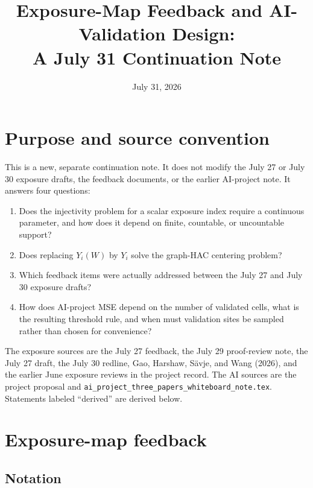 \documentclass[11pt]{article}
\title{Exposure-Map Feedback and AI-Validation Design:\\
A July 31 Continuation Note}
\author{}
\date{July 31, 2026}
\begin{document}
\maketitle

\section*{Purpose and source convention}

This is a new, separate continuation note. It does not modify the July 27 or
July 30 exposure drafts, the feedback documents, or the earlier AI-project
note. It answers four questions:
\begin{enumerate}[leftmargin=2em]
    \item Does the injectivity problem for a scalar exposure index require a
    continuous parameter, and how does it depend on finite, countable, or
    uncountable support?
    \item Does replacing \(Y_i(W)\) by \(Y_i\) solve the graph-HAC centering
    problem?
    \item Which feedback items were actually addressed between the July 27 and
    July 30 exposure drafts?
    \item How does AI-project MSE depend on the number of validated cells, what
    is the resulting threshold rule, and when must validation sites be sampled
    rather than chosen for convenience?
\end{enumerate}

The exposure sources are the July 27 feedback, the July 29 proof-review note,
the July 27 draft, the July 30 redline, Gao, Harshaw, S\"avje, and Wang (2026),
and the earlier June exposure reviews in the project record. The AI sources are
the project proposal and
\texttt{ai\_project\_three\_papers\_whiteboard\_note.tex}.
Statements labeled ``derived'' are derived below.

\section{Exposure-map feedback}

\subsection*{Notation}
\end{document}
